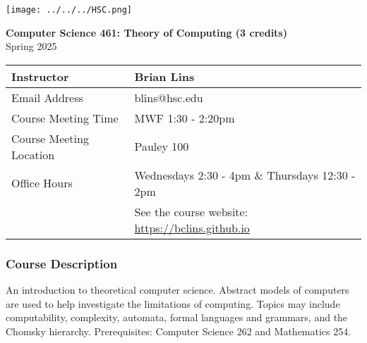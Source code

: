\documentclass[10pt]{article}
\begin{document}
%


\begin{center}
\texttt{[image: ../../../HSC.png]} 
\bigskip

\textbf{Computer Science 461: Theory of Computing (3 credits)} \\
Spring 2025
\end{center}

\noindent
\begin{tabular}{|l|l|}
\hline
Instructor & Brian Lins \\ \hline
Email Address & blins@hsc.edu \\ \hline
Course Meeting Time & MWF 1:30 - 2:20pm \\ \hline
Course Meeting Location & Pauley 100 \\ \hline
Office Hours & Wednesdays 2:30 - 4pm \& Thursdays 12:30 - 2pm \\ 
& See the course website: \url{https://bclins.github.io} ~ \\ \hline
\end{tabular}

\subsubsection*{Course Description}

An introduction to theoretical computer science. Abstract models of computers are used to help investigate the limitations of computing. Topics may include computability, complexity, automata, formal languages and grammars, and the Chomsky hierarchy. Prerequisites: Computer Science 262 and Mathematics 254. 
\end{document}
